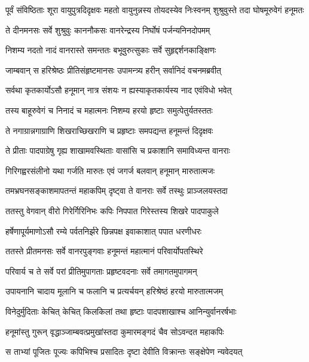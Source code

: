 \threelineshloka
{पूर्वं संविष्ठिताः शूरा वायुपुत्रदिदृक्षवः}
{महतो वायुनुन्नस्य तोयदस्येव निःस्वनम्}
{शुश्रुवुस्ते तदा घोषमूरुवेगं हनूमतः} %

\twolineshloka
{ते दीनमनसः सर्वे शुश्रुवुः काननौकसः}
{वानरेन्द्रस्य निर्घोषं पर्जन्यनिनदोपमम्} %

\twolineshloka
{निशम्य नदतो नादं वानरास्ते समन्ततः}
{बभूवुरुत्सुकाः सर्वे सुहृद्दर्शनकाङ्क्षिणः} %

\twolineshloka
{जाम्बवान् स हरिश्रेष्ठः प्रीतिसंहृष्टमानसः}
{उपामन्त्र्य हरीन् सर्वानिदं वचनमब्रवीत्} %

\twolineshloka
{सर्वथा कृतकार्योऽसौ हनूमान् नात्र संशयः}
{न ह्यस्याकृतकार्यस्य नाद एवंविधो भवेत्} %

\twolineshloka
{तस्य बाहूरुवेगं च निनादं च महात्मनः}
{निशम्य हरयो हृष्टाः समुत्पेतुर्यतस्ततः} %

\twolineshloka
{ते नगाग्रान्नगाग्राणि शिखराच्छिखराणि च}
{प्रहृष्टाः समपद्यन्त हनूमन्तं दिदृक्षवः} %

\twolineshloka
{ते प्रीताः पादपाग्रेषु गृह्य शाखामवस्थिताः}
{वासांसि च प्रकाशानि समाविध्यन्त वानराः} %

\twolineshloka
{गिरिगह्वरसंलीनो यथा गर्जति मारुतः}
{एवं जगर्ज बलवान् हनूमान् मारुतात्मजः} %

\twolineshloka
{तमभ्रघनसङ्काशमापतन्तं महाकपिम्}
{दृष्ट्वा ते वानराः सर्वे तस्थुः प्राञ्जलयस्तदा} %

\twolineshloka
{ततस्तु वेगवान् वीरो गिरेर्गिरिनिभः कपिः}
{निपपात गिरेस्तस्य शिखरे पादपाकुले} %

\twolineshloka
{हर्षेणापूर्यमाणोऽसौ रम्ये पर्वतनिर्झरे}
{छिन्नपक्ष इवाकाशात् पपात धरणीधरः} %

\twolineshloka
{ततस्ते प्रीतमनसः सर्वे वानरपुङ्गवाः}
{हनूमन्तं महात्मानं परिवार्योपतस्थिरे} %

\twolineshloka
{परिवार्य च ते सर्वे परां प्रीतिमुपागताः}
{प्रहृष्टवदनाः सर्वे तमागतमुपागमन्} %

\twolineshloka
{उपायनानि चादाय मूलानि च फलानि च}
{प्रत्यर्चयन् हरिश्रेष्ठं हरयो मारुतात्मजम्} %

\twolineshloka
{विनेदुर्मुदिताः केचित् केचित् किलकिलां तथा}
{हृष्टाः पादपशाखाश्च आनिन्युर्वानरर्षभाः} %

\twolineshloka
{हनूमांस्तु गुरून् वृद्धाञ्जाम्बवत्प्रमुखांस्तदा}
{कुमारमङ्गदं चैव सोऽवन्दत महाकपिः} %

\twolineshloka
{स ताभ्यां पूजितः पूज्यः कपिभिश्च प्रसादितः}
{दृष्टा देवीति विक्रान्तः सङ्क्षेपेण न्यवेदयत्} %

